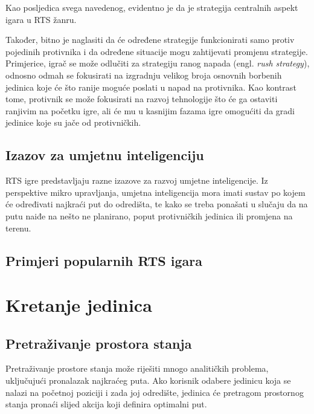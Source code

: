 \documentclass[times, utf8, zavrsni, numeric]{fer}
\begin{document}
\par Kao posljedica svega navedenog, evidentno je da je strategija centralnih aspekt igara u RTS žanru. 

\par Također, bitno je naglasiti da će određene strategije funkcionirati samo protiv pojedinih protivnika i da određene situacije mogu zahtijevati promjenu strategije. 
Primjerice, igrač se može odlučiti za strategiju ranog napada (engl. \textit{rush strategy}), odnosno odmah se fokusirati na izgradnju velikog broja osnovnih borbenih jedinica koje će što ranije moguće poslati u napad na protivnika.
Kao kontrast tome, protivnik se može fokusirati na razvoj tehnologije što će ga ostaviti ranjivim na početku igre, ali će mu u kasnijim fazama igre omogućiti da gradi jedinice koje su jače od protivničkih.

\section{Izazov za umjetnu inteligenciju}

\par RTS igre predstavljaju razne izazove za razvoj umjetne inteligencije. 
Iz perspektive mikro upravljanja, umjetna inteligencija mora imati sustav po kojem će određivati najkraći put do odredišta, te kako se treba ponašati u slučaju da na putu naiđe na nešto ne planirano, poput protivničkih jedinica ili promjena na terenu.


\section{Primjeri popularnih RTS igara}

\chapter{Kretanje jedinica}\label{ch:pathfinding}

\section{Pretraživanje prostora stanja}\label{sec:stateSearch}
\par Pretraživanje prostore stanja može riješiti mnogo analitičkih problema, uključujući pronalazak najkraćeg puta. 
Ako korisnik odabere jedinicu koja se nalazi na početnoj poziciji i zada joj odredište, jedinica će pretragom prostornog stanja pronaći slijed akcija koji definira optimalni put.
\end{document}
